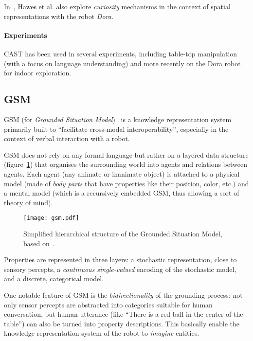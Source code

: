 \documentclass{IEEEtran}
\begin{document}
In~\cite{Hawes2011}, Hawes et al. also explore \emph{curiosity} mechanisms in
the context of spatial representations with the robot \emph{Dora}.

\paragraph{Experiments} CAST has been used in several experiments, including
table-top manipulation (with a focus on language understanding) and more
recently on the Dora robot~\cite{Hawes2011} for indoor exploration.

\subsection{GSM}
\label{sect|gsm}

GSM (for \emph{Grounded Situation Model})~\cite{Mavridis2006} is a knowledge
representation system primarily built to ``facilitate cross-modal
interoperability'',  especially in the context of verbal interaction with a
robot.

GSM does not rely on any formal language but rather on a layered data structure
(figure~\ref{fig|gsm}) that organises the surrounding world into agents and
relations between agents.  Each agent (any animate or inanimate object) is
attached to a physical model (made of \emph{body parts} that have properties
like their position, color, etc.) and a mental model (which is a recursively
embedded GSM, thus allowing a sort of theory of mind).

\begin{figure}
    \centering
    \texttt{[image: gsm.pdf]}

    \caption{Simplified hierarchical structure of the Grounded Situation Model,
    based on~\cite{Mavridis2006}.}

    \label{fig|gsm}
\end{figure}

Properties are represented in three layers: a stochastic representation, close
to sensory percepts, a \emph{continuous single-valued} encoding of the
stochastic model, and a discrete, categorical model.

One notable feature of GSM is the \emph{bidirectionality} of the grounding
process: not only sensor percepts are abstracted into categories suitable for
human conversation, but human utterance (like ``There is a red ball in the
center of the table'') can also be turned into property descriptions. This
basically enable the knowledge representation system of the robot to
\emph{imagine} entities.
\end{document}
